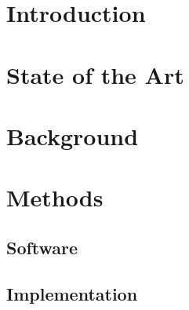 \documentclass  [
  paper    = a4,
  BCOR     = 10mm,
  twoside,
  fontsize = 12pt,
  toc      = bibnumbered,
  toc      = listofnumbered,
  numbers  = noendperiod,
  headings = normal,
  listof   = leveldown,
  version  = 3.03
]                                       {scrreprt}
\begin{document}
  

  \tableofcontents
  
  \chapter{Introduction}
    
  \chapter{State of the Art}
  \label{sec::2_sota}
    
  \chapter{Background}
  
   
  \chapter{Methods}
  \section{Software}
  
  \section{Implementation}  
   
\end{document}
